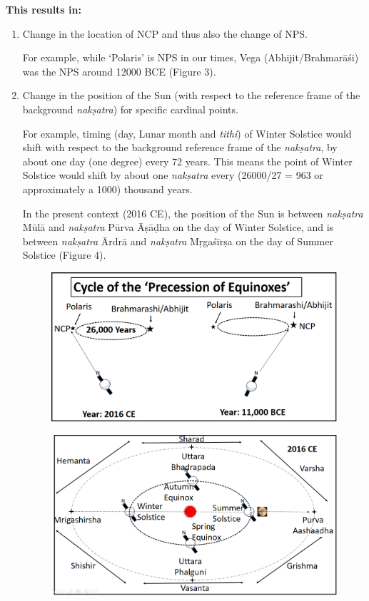 \textbf{This results in:}

\begin{enumerate}
\itemsep=0pt
\item 
 Change in the location of NCP and thus also the change of NPS.

 For example, while ‘Polaris’ is NPS in our times, Vega (Abhijit/Brahmarāśi) was the NPS around 12000 BCE (Figure 3).

 \item 
 Change in the position of the Sun (with respect to the reference frame of the background \textit{nakṣatra}) for specific cardinal points.

 For example, timing (day, Lunar month and \textit{tithi}) of Winter Solstice would shift with respect to the background reference frame of the \textit{nakṣatra}, by about one day (one degree) every 72 years. This means the point of Winter Solstice would shift by about one \textit{nakṣatra} every (26000/27 = 963 or approximately a 1000) thousand years.

 In the present context (2016 CE), the position of the Sun is between \textit{nakṣatra} Mūlā and \textit{nakṣatra} Pūrva Āṣāḍha on the day of Winter Solstice, and is between \textit{nakṣatra} Ārdrā and \textit{nakṣatra} Mṛgaśīrṣa on the day of Summer Solstice (Figure 4).


\begin{figure}[!h]
\includegraphics[scale=.17]{images/chap2-4.jpg}
\caption{}\label{chap1-fig3}
\end{figure}


\begin{figure}[!h]
\includegraphics[scale=.165]{images/chap2-5.jpg}
\caption{}\label{chap1-fig4}
\end{figure}


\end{enumerate}
